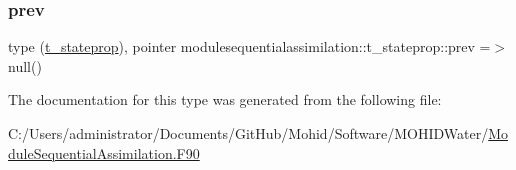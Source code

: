 \mbox{\label{structmodulesequentialassimilation_1_1t__stateprop_ad6a919269515c178ede320274a64451b}} 
\subsubsection{\texorpdfstring{prev}{prev}}
{\footnotesize\ttfamily type (\mbox{\hyperlink{structmodulesequentialassimilation_1_1t__stateprop}{t\+\_\+stateprop}}), pointer modulesequentialassimilation\+::t\+\_\+stateprop\+::prev =$>$ null()\hspace{0.3cm}{\ttfamily [private]}}



The documentation for this type was generated from the following file\+:\begin{DoxyCompactItemize}
\item 
C\+:/\+Users/administrator/\+Documents/\+Git\+Hub/\+Mohid/\+Software/\+M\+O\+H\+I\+D\+Water/\mbox{\hyperlink{_module_sequential_assimilation_8_f90}{Module\+Sequential\+Assimilation.\+F90}}\end{DoxyCompactItemize}
